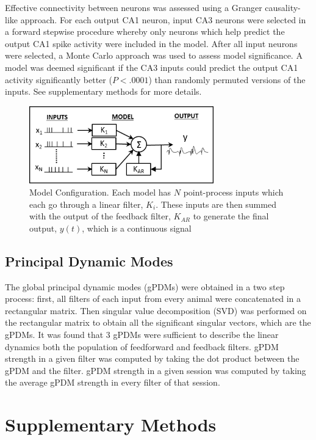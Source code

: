 \documentclass[11pt,a4paper,final]{article}
\begin{document}
Effective connectivity between neurons was assessed using a Granger causality-like approach.
For each output CA1 neuron, input CA3 neurons were selected in a forward stepwise procedure whereby only neurons which help predict the output CA1 spike activity were included in the model.
After all input neurons were selected, a Monte Carlo approach was used to assess model significance.
A model was deemed significant if the CA3 inputs could predict the output CA1 activity significantly better ($P<.0001$) than randomly permuted versions of the inputs.
See supplementary methods for more details.

\begin{figure}[!ht]
\centering
\includegraphics[width=80mm]{MVAR}
\caption[Model configuration schema]{
Model Configuration. Each model has $N$ point-process inputs which each go through a linear filter, $K_i$. These inputs are then summed with the output of the feedback filter, $K_{AR}$ to generate the final output, $y(t)$, which is a continuous signal}
\label{fMVAR}
\end{figure}

    \subsection{Principal Dynamic Modes \label{PDMs}}
The global principal dynamic modes (gPDMs) were obtained in a two step process: first, all filters of each input from every animal were concatenated in a rectangular matrix. Then  singular value decomposition (SVD) was performed on the rectangular matrix to obtain all the significant singular vectors, which are the gPDMs.
It was found that 3 gPDMs were sufficient to describe the linear dynamics both the population of feedforward and feedback filters.
gPDM strength in a given filter was computed by taking the dot product between the gPDM and the filter.
gPDM strength in a given session was computed by taking the average gPDM strength in every filter of that session.



\appendix
\renewcommand\thefigure{S\arabic{figure}} 
\setcounter{figure}{0} 

\section{Supplementary Methods \label{SM}}
\end{document}
